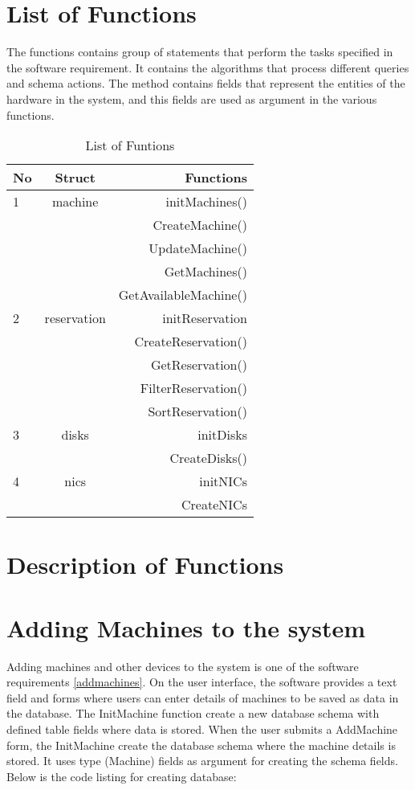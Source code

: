 \section{List of Functions}
The functions contains group of statements that perform the tasks specified in the software requirement. It contains the algorithms that process different  queries and schema actions. The method contains fields that represent the entities of the hardware in the system, and this fields are used as argument in the various functions. 
\begin{table}[h!]
  \centering
  \label{tab:table1}
  \begin{tabular}{l|c||r}
    No & Struct& Functions\\
    \hline
    1 &machine &  initMachines()\\
      && CreateMachine()\\
      &&UpdateMachine()\\
      &&GetMachines()\\
      &&GetAvailableMachine()\\
     \hline
    2 &reservation & initReservation\\
    && CreateReservation()\\
    && GetReservation()\\
    && FilterReservation()\\
    && SortReservation()\\
    \hline
    3 &disks & initDisks\\
    && CreateDisks()\\
    \hline
    4 &nics & initNICs\\
    && CreateNICs
  \end{tabular}
  \caption{List of Funtions}
\end{table}

\pagebreak
\section{Description of Functions}
\section*{Adding Machines to the system}
Adding machines and other devices to the system is one of the software  requirements \ref{addmachines}. On the user interface, the software provides a text field and forms where users can enter details of machines to be saved as data in the database. The InitMachine function create a new database schema with defined table fields where data is stored. When the user submits a AddMachine form, the InitMachine create the database schema where the machine details is stored. It uses type (Machine) fields as argument for creating the schema fields. Below is the code listing for creating database:


